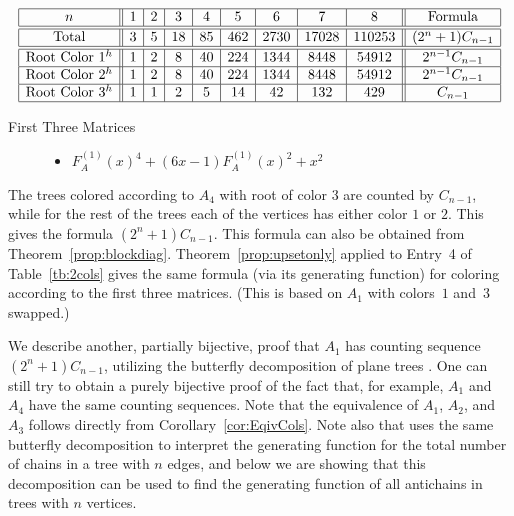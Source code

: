 \documentclass[12pt]{amsart}
\newcommand{\gff}[2]{F_{#2}^{(#1)}(x)}
\newcommand{\gfa}[1]{\gff{#1}{A}}
\begin{document}
\begin{description}
\begin{description}
        \begin{center}
            \[
            \begin{array}{|c||c|c|c|c|c|c|c|c||c|}\hline
               n  & 1 & 2 & 3 & 4 & 5 & 6 & 7 & 8  & \text{Formula}\\\hline\hline
               \text{Total}  & 3 & 5 & 18 & 85 & 462 & 2730 & 17028 & 110253 & (2^{n}+1)C_{n-1}\\\hline\hline
               \text{Root Color }1^{h} & 1 & 2 & 8 & 40 & 224 & 1344 & 8448 & 54912 & 2^{n-1}C_{n-1}\\\hline
               \text{Root Color }2^{h} & 1 & 2 & 8 & 40 & 224 & 1344 & 8448 & 54912 & 2^{n-1}C_{n-1}\\\hline
               \text{Root Color }3^{h} & 1 & 1 & 2 & 5 & 14 & 42 & 132 & 429 & C_{n-1}\\\hline
            \end{array}
            \]
        \end{center}
    \end{description}
    
    \item[Nontrivial Functional Equations]\hspace*{\fill}
    \begin{description}
        \item[First Three Matrices]\hspace*{\fill}

        \begin{itemize}
\item $\gfa{1}^4+(6x - 1)\gfa{1}^2+x^2$


\end{itemize}

        
    \end{description}
    \item[Discussion] The trees colored according to $A_4$ with root of color 3 are counted by $C_{n-1}$, while for the rest of the trees each of the vertices has either color $1$ or $2$. This gives the formula $(2^{n}+1)C_{n-1}$. This formula can also be obtained from Theorem~\ref{prop:blockdiag}. Theorem~\ref{prop:upsetonly} applied to Entry~4 of Table~\ref{tb:2cols} gives the same formula (via its generating function) for coloring according to the first three matrices. (This is based on $A_1$ with colors~$1$ and~$3$ swapped.)

    We describe another, partially bijective, proof that $A_1$ has counting sequence $(2^{n}+1)C_{n-1}$, utilizing the butterfly decomposition of plane trees \cite[Section 2]{CLS2007Butterfly}. One can still try to obtain a purely bijective proof of the fact that, for example, $A_1$ and $A_4$ have the same counting sequences. Note that the equivalence of $A_1$, $A_2$, and $A_3$ follows directly from Corollary~\ref{cor:EqivCols}. Note also that \cite[Section 5]{CLS2007Butterfly} uses the same butterfly decomposition to interpret the generating function for the total number of chains in a tree with $n$ edges, and below we are showing that this decomposition can be used to find the generating function of all antichains in trees with $n$ vertices.


\end{description}
\end{document}
